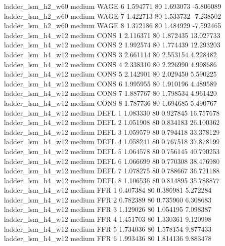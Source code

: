   ladder_lsm_h2_w60     medium     WAGE                 6  1.594771 80       1.693073          -5.806089
  ladder_lsm_h2_w60     medium     WAGE                 7  1.422713 80       1.533732          -7.238502
  ladder_lsm_h2_w60     medium     WAGE                 8  1.372186 80       1.484929          -7.592465
  ladder_lsm_h4_w12     medium     CONS                 1  2.116371 80       1.872435          13.027733
  ladder_lsm_h4_w12     medium     CONS                 2  1.992574 80       1.774439          12.293203
  ladder_lsm_h4_w12     medium     CONS                 3  2.661114 80       2.553154           4.228482
  ladder_lsm_h4_w12     medium     CONS                 4  2.338310 80       2.226990           4.998686
  ladder_lsm_h4_w12     medium     CONS                 5  2.142901 80       2.029450           5.590225
  ladder_lsm_h4_w12     medium     CONS                 6  1.995955 80       1.910196           4.489589
  ladder_lsm_h4_w12     medium     CONS                 7  1.887767 80       1.798534           4.961420
  ladder_lsm_h4_w12     medium     CONS                 8  1.787736 80       1.694685           5.490767
  ladder_lsm_h4_w12     medium     DEFL                 1  1.083330 80       0.927845          16.757678
  ladder_lsm_h4_w12     medium     DEFL                 2  1.051908 80       0.834183          26.100362
  ladder_lsm_h4_w12     medium     DEFL                 3  1.059579 80       0.794418          33.378129
  ladder_lsm_h4_w12     medium     DEFL                 4  1.058241 80       0.767518          37.878199
  ladder_lsm_h4_w12     medium     DEFL                 5  1.064578 80       0.756145          40.790253
  ladder_lsm_h4_w12     medium     DEFL                 6  1.066699 80       0.770308          38.476980
  ladder_lsm_h4_w12     medium     DEFL                 7  1.078275 80       0.788667          36.721188
  ladder_lsm_h4_w12     medium     DEFL                 8  1.106536 80       0.814895          35.788877
  ladder_lsm_h4_w12     medium      FFR                 1  0.407384 80       0.386981           5.272284
  ladder_lsm_h4_w12     medium      FFR                 2  0.782389 80       0.735960           6.308683
  ladder_lsm_h4_w12     medium      FFR                 3  1.129026 80       1.054195           7.098387
  ladder_lsm_h4_w12     medium      FFR                 4  1.451703 80       1.330361           9.120998
  ladder_lsm_h4_w12     medium      FFR                 5  1.734036 80       1.578154           9.877433
  ladder_lsm_h4_w12     medium      FFR                 6  1.993436 80       1.814136           9.883478
